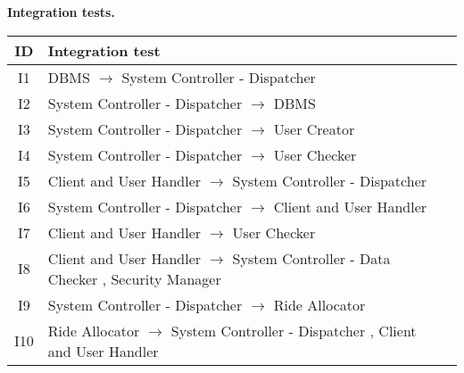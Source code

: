 \documentclass[\mainpath/main]{subfiles}
\begin{document}
\textbf{Integration tests.}\\
\begin{table}
	\centering
	\begin{tabular}[!ht]{c|p{12cm}c}
		ID & Integration test & \\ \hline
		I1 &  \centering DBMS $\rightarrow$ System Controller - Dispatcher  & \\ \hline
		I2 & \centering System Controller - Dispatcher $\rightarrow$ DBMS  & \\ \hline
		I3 & \centering System Controller - Dispatcher $\rightarrow$ User Creator   & \\ \hline
		I4 & \centering System Controller - Dispatcher $\rightarrow$ User Checker   & \\ \hline
		I5 & \centering Client and User Handler $\rightarrow$ System Controller - Dispatcher   & \\ \hline
		I6 & \centering System Controller - Dispatcher $\rightarrow$ Client and User Handler   & \\ \hline
		I7 & \centering Client and User Handler $\rightarrow$ User Checker   & \\ \hline
		I8 & \centering Client and User Handler $\rightarrow$ System Controller - Data Checker , Security Manager   & \\ \hline
		I9 & \centering System Controller - Dispatcher $\rightarrow$ Ride Allocator   & \\ \hline
		I10 & \centering Ride Allocator $\rightarrow$ System Controller - Dispatcher , Client and User Handler   & \\ \hline
	\end{tabular}
\end{table}
\end{document}
